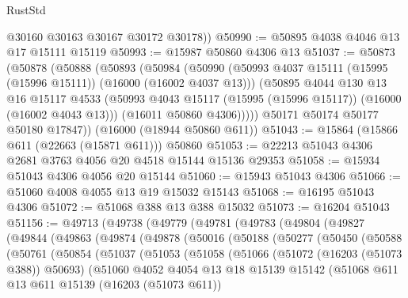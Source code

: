 \begin{lexlean}{RustStd}
\begin{coremodule}
        @30160
        @30163
        @30167
        @30172
        @30178))
@50990 := @50895 @4038 @4046 @13 @17 @15111 @15119
@50993 := @15987 @50860 @4306 @13
@51037 := @50873
    (@50878
      (@50888
        (@50893
          (@50984
            (@50990
              (@50993 @4037 @15111 (@15995 (@15996 @15111)) (@16000 (@16002 @4037 @13)))
              (@50895
                @4044
                @130
                @13
                @16
                @15117
                @4533
                (@50993 @4043 @15117 (@15995 (@15996 @15117)) (@16000 (@16002 @4043 @13)))
                (@16011 @50860 @4306)))))
        @50171
        @50174
        @50177
        @50180
        @17847))
    (@16000 (@18944 @50860 @611))
@51043 := @15864 (@15866 @611 (@22663 (@15871 @611))) @50860
@51053 := @22213 @51043 @4306 @2681 @3763 @4056 @20 @4518 @15144 @15136 @29353
@51058 := @15934 @51043 @4306 @4056 @20 @15144
@51060 := @15943 @51043 @4306
@51066 := @51060 @4008 @4055 @13 @19 @15032 @15143
@51068 := @16195 @51043 @4306
@51072 := @51068 @388 @13 @388 @15032
@51073 := @16204 @51043
@51156 := @49713
    (@49738
      (@49779
        (@49781
          (@49783
            (@49804
              (@49827
                (@49844
                  (@49863
                    (@49874
                      (@49878
                        (@50016
                          (@50188
                            (@50277
                              (@50450
                                (@50588
                                  (@50761
                                    (@50854
                                      (@51037
                                        (@51053
                                          (@51058
                                            (@51066
                                              (@51072 (@16203 (@51073 @388)) @50693)
                                              (@51060
                                                @4052
                                                @4054
                                                @13
                                                @18
                                                @15139
                                                @15142
                                                (@51068
                                                  @611
                                                  @13
                                                  @611
                                                  @15139
                                                  (@16203 (@51073 @611))

\end{coremodule}
\end{lexlean}
